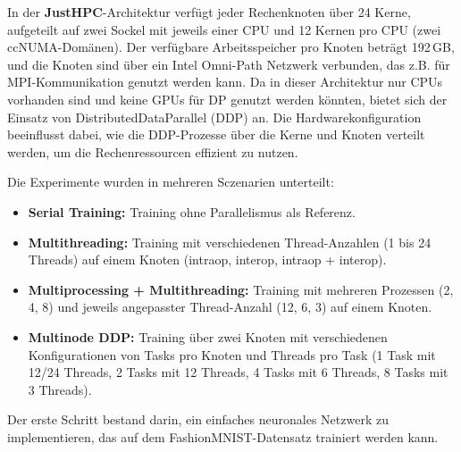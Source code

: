 \documentclass{article}
\begin{document}
In der \textbf{JustHPC}-Architektur verfügt jeder Rechenknoten über 24 Kerne, aufgeteilt auf zwei Sockel mit jeweils einer CPU und 12 Kernen pro CPU 
(zwei ccNUMA-Domänen). Der verfügbare Arbeitsspeicher pro Knoten beträgt 192\,GB, 
und die Knoten sind über ein Intel Omni-Path Netzwerk verbunden, das z.B. für MPI-Kommunikation genutzt werden kann. 
Da in dieser Architektur nur CPUs vorhanden sind und keine GPUs für DP genutzt werden könnten, bietet sich der Einsatz von DistributedDataParallel (DDP) an. 
Die Hardwarekonfiguration beeinflusst dabei, wie die DDP-Prozesse über die Kerne und Knoten verteilt werden, um die Rechenressourcen effizient zu nutzen.

Die Experimente wurden in mehreren Sczenarien unterteilt:
\begin{itemize}
    \item \textbf{Serial Training:} Training ohne Parallelismus als Referenz.
    \item \textbf{Multithreading:} Training mit verschiedenen Thread-Anzahlen (1 bis 24 Threads) auf einem Knoten (intraop, interop, intraop + interop).
    \item \textbf{Multiprocessing + Multithreading:} Training mit mehreren Prozessen (2, 4, 8) und jeweils angepasster Thread-Anzahl (12, 6, 3) auf einem Knoten.
    \item \textbf{Multinode DDP:} Training über zwei Knoten mit verschiedenen Konfigurationen von Tasks pro Knoten und Threads pro Task (1 Task mit 12/24 Threads, 2 Tasks mit 12 Threads, 4 Tasks mit 6 Threads, 8 Tasks mit 3 Threads).
\end{itemize}

Der erste Schritt bestand darin, ein einfaches neuronales Netzwerk zu implementieren, das auf dem FashionMNIST-Datensatz trainiert werden kann.
\end{document}
